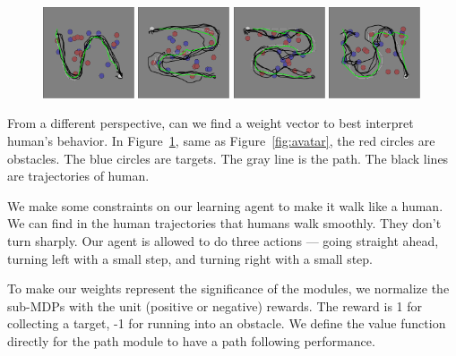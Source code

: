 \documentclass[11pt]{article} %
\begin{document}
\begin{figure}[h!]
\centering
\includegraphics[width=0.24\textwidth]{task_1.png}
\includegraphics[width=0.24\textwidth]{task_2.png}
\includegraphics[width=0.24\textwidth]{task_3.png}
\includegraphics[width=0.24\textwidth]{task_4.png}
\caption{}
\label{fig:exp}
\end{figure}

From a different perspective, can we find a weight vector to best interpret
human's behavior. In Figure~\ref{fig:exp}, same as Figure~\ref{fig:avatar}, the
red circles are obstacles. The blue circles are targets. The gray line is the
path. The black lines are trajectories of human.

We make some constraints on our learning agent to make it walk like a human.
We can find in the human trajectories that humans walk smoothly. They don't turn
sharply.  Our agent is allowed to do three actions --- going straight ahead,
turning left with a small step, and turning right with a small step.

To make our weights represent the significance of the modules, we
normalize the sub-MDPs with the unit (positive or negative) rewards. The reward
is 1 for collecting a target, -1 for running into an obstacle. We define the
value function directly for the path module to have a path following performance.
\end{document}
